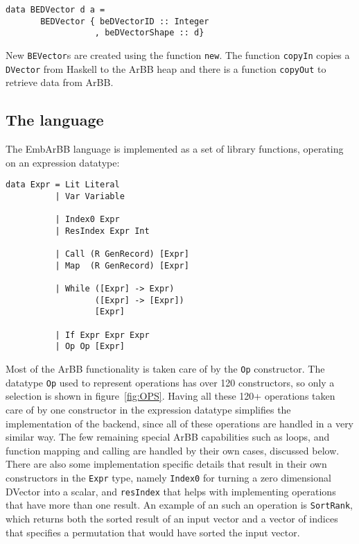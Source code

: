 \begin{verbatim}
data BEDVector d a = 
       BEDVector { beDVectorID :: Integer
                  , beDVectorShape :: d}  
\end{verbatim}

New {\tt BEVector}s are created using the function {\tt new}.
The function {\tt copyIn} copies a {\tt DVector} from Haskell to the ArBB heap 
and there is a function {\tt copyOut} to retrieve data from ArBB.  


\subsection{The language} 
The EmbArBB language is implemented as a set of library functions, operating on an expression datatype:

\begin{verbatim} 
data Expr = Lit Literal
          | Var Variable 
            
          | Index0 Expr 
          | ResIndex Expr Int 
            
          | Call (R GenRecord) [Expr]  
          | Map  (R GenRecord) [Expr]   
            
          | While ([Expr] -> Expr)  
                  ([Expr] -> [Expr])  
                  [Expr] 
                             
          | If Expr Expr Expr 
          | Op Op [Expr]   
\end{verbatim} 
Most of the ArBB functionality is taken care of by the {\tt Op} constructor. 
The datatype {\tt Op} used to represent operations has over 120 
constructors, so only a selection is shown in figure~\ref{fig:OPS}. 
Having all these 120+ operations taken care of by one constructor in 
the expression datatype simplifies the implementation of the backend, 
since all of these operations are handled in a very similar way. The few 
remaining special ArBB capabilities such as loops, and function mapping 
and calling are handled by their own cases, discussed below. There are 
also some implementation specific details that result in their own 
constructors in the {\tt Expr} type, namely {\tt Index0} for turning a 
zero dimensional DVector into a scalar, and {\tt resIndex} that helps with 
implementing operations that have more than one result. An example of an 
such an operation is {\tt SortRank}, which returns both the sorted result 
of an input vector and a vector of indices that specifies a permutation 
that would have sorted the input vector. 

